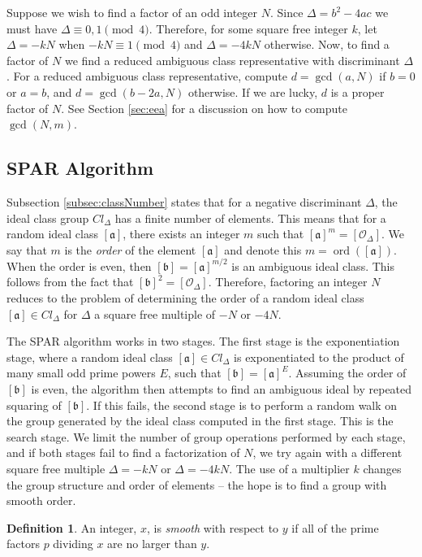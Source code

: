 \documentclass{ucalgthes1}
\theoremstyle{definition}
\newtheorem{defn}[thm]{Definition}
\DeclareMathOperator{\ord}{ord}
\newcommand{\aclass}{[\mathfrak a]}
\newcommand{\bclass}{[\mathfrak b]}
\newcommand{\idclass}{[\mathcal O_\Delta]}
\begin{document}
Suppose we wish to find a factor of an odd integer $N$. Since $\Delta = b^2 - 4ac$ we must have $\Delta \equiv 0, 1 \pmod 4$.  Therefore, for some square free integer $k$, let $\Delta = -kN$ when $-kN \equiv 1 \pmod 4$ and $\Delta = -4kN$ otherwise.  Now, to find a factor of $N$ we find a reduced ambiguous class representative with discriminant $\Delta$.  For a reduced ambiguous class representative, compute $d = \gcd(a, N)$ if $b = 0$ or $a = b$, and $d = \gcd(b-2a, N)$ otherwise.  If we are lucky, $d$ is a proper factor of $N$. See Section \ref{sec:eea} for a discussion on how to compute $\gcd(N, m)$.


\subsection{SPAR Algorithm}

Subsection \ref{subsec:classNumber} states that for a negative discriminant $\Delta$, the ideal class group $Cl_\Delta$ has a finite number of elements.  This means that for a random ideal class $\aclass$, there exists an integer $m$ such that $\aclass^m = \idclass$. We say that $m$ is the \emph{order} of the element $\aclass$ and denote this $m = \ord(\aclass)$.  When the order is even, then $\bclass = \aclass^{m/2}$ is an ambiguous ideal class.  This follows from the fact that $\bclass^2 = \idclass$.  Therefore, factoring an integer $N$ reduces to the problem of determining the order of a random ideal class $\aclass \in Cl_\Delta$ for $\Delta$ a square free multiple of $-N$ or $-4N$.

The SPAR algorithm works in two stages. The first stage is the exponentiation stage, where a random ideal class $\aclass \in Cl_\Delta$ is exponentiated to the product of many small odd prime powers $E$, such that $\bclass = \aclass^E$.  Assuming the order of $\bclass$ is even, the algorithm then attempts to find an ambiguous ideal by repeated squaring of $\bclass$.  If this fails, the second stage is to perform a random walk on the group generated by the ideal class computed in the first stage.  This is the search stage.  We limit the number of group operations performed by each stage, and if both stages fail to find a factorization of $N$, we try again with a different square free multiple $\Delta = -kN$ or $\Delta = -4kN$.  The use of a multiplier $k$ changes the group structure and order of elements -- the hope is to find a group with smooth order.

\begin{defn}
An integer, $x$, is \emph{smooth} with respect to $y$ if all of the prime factors $p$ dividing $x$ are no larger than $y$.
\end{defn}
\end{document}
